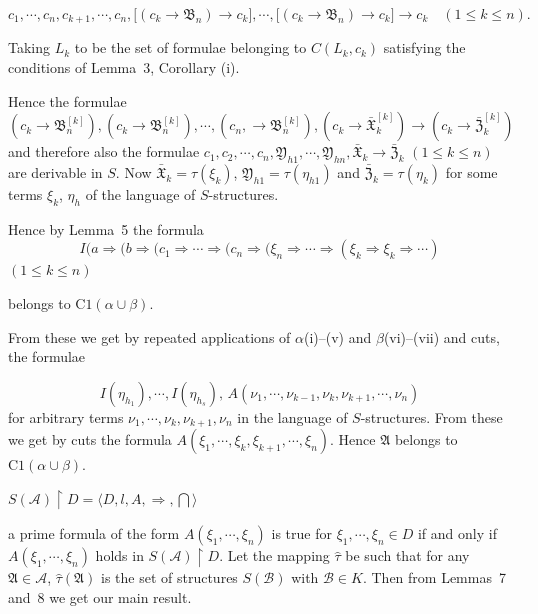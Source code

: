 \documentclass[12pt,a4paper]{article}
\begin{document}
\[
c_1, \cdots, c_n, c_{k+1}, \cdots, c_n,
\bigl[(c_k \to \mathfrak{B}_n) \to c_k\bigr],
\cdots,
\bigl[(c_k \to \mathfrak{B}_n) \to c_k\bigr]
\to c_k \quad (1 \le k \le n).
\]

Taking $L_k$ to be the set of formulae belonging to $C(L_k, c_k)$ satisfying
the conditions of Lemma~3, Corollary (i).

Hence the formulae
$(c_k \to \mathfrak{B}_n^{[k]}), (c_k \to \mathfrak{B}_n^{[k]}),
\cdots, (c_n, \to \mathfrak{B}_n^{[k]}), (c_k \to \bar{\mathfrak{X}}_k^{[k]})
\to (c_k \to \bar{\mathfrak{Z}}_k^{[k]})$
and therefore also the formulae
$c_1, c_2, \cdots, c_n, \mathfrak{Y}_{h1}, \cdots, \mathfrak{Y}_{hn},
\bar{\mathfrak{X}}_k \to \bar{\mathfrak{Z}}_k$ $(1 \le k \le n)$ are
derivable in $S$. Now $\bar{\mathfrak{X}}_k = \tau(\xi_k)$,
$\mathfrak{Y}_{h1} = \tau(\eta_{h1})$ and $\bar{\mathfrak{Z}}_k = \tau(\eta_k)$
for some terms $\xi_k$, $\eta_h$ of the language of $S$-structures.

\bigskip\noindent
Hence by Lemma~5 the formula
\[
I(a \Rightarrow (b \Rightarrow (c_1 \Rightarrow \cdots \Rightarrow
  (c_n \Rightarrow (\xi_n \Rightarrow \cdots \Rightarrow
  (\xi_k \Rightarrow \xi_k \Rightarrow \cdots)
\]
$(1 \le k \le n)$

belongs to $\mathrm{C1}(\alpha \cup \beta)$.

From these we get by repeated applications of $\alpha$(i)--(v) and
$\beta$(vi)--(vii) and cuts, the formulae

\[
I(\eta_{h_1}), \cdots, I(\eta_{h_s}),\,
A(\nu_1, \cdots, \nu_{k-1}, \nu_k, \nu_{k+1}, \cdots, \nu_n)
\]
for arbitrary terms $\nu_1, \cdots, \nu_k, \nu_{k+1}, \nu_n$ in the language
of $S$-structures.
From these we get by cuts the formula
$A(\xi_1, \cdots, \xi_k, \xi_{k+1}, \cdots, \xi_n)$.
Hence $\mathfrak{A}$ belongs to $\mathrm{C1}(\alpha \cup \beta)$.

\bigskip
\noindent
$S(\mathscr{A}) \upharpoonright D = \langle D, l, A, \Rightarrow, \bigcap\rangle$

a prime formula of the form $A(\xi_1, \cdots, \xi_n)$ is true for
$\xi_1, \cdots, \xi_n \in D$ if and only if $A(\xi_1, \cdots, \xi_n)$ holds
in $S(\mathscr{A}) \upharpoonright D$. Let the mapping $\hat{\tau}$ be such
that for any $\mathfrak{A} \in \mathscr{A}$, $\hat{\tau}(\mathfrak{A})$ is the
set of structures $S(\mathscr{B})$ with $\mathscr{B} \in K$. Then from
Lemmas~7 and~8 we get our main result.
\end{document}
